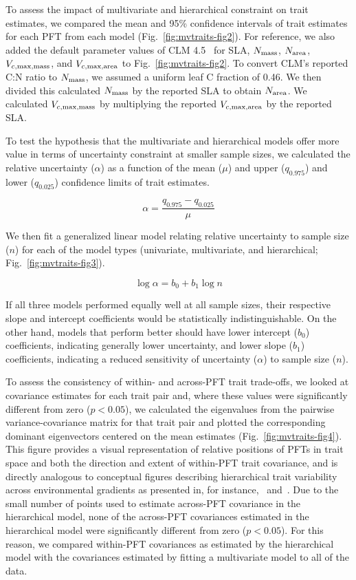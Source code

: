 To assess the impact of multivariate and hierarchical constraint on trait estimates,
we compared the mean and 95\% confidence intervals of trait estimates for each PFT from each model (Fig.~\ref{fig:mvtraits-fig2}).
For reference, we also added the default parameter values of CLM 4.5~\cite[Table 8.1 in][]{clm45_note} for SLA, $N_{\text{mass}}$, $N_{\text{area}}$, $V_{c,\max,\text{mass}}$, and $V_{c,\max,\text{area}}$ to Fig.~\ref{fig:mvtraits-fig2}.
To convert CLM's reported C:N ratio to $N_{\text{mass}}$, we assumed a uniform leaf C fraction of 0.46.
We then divided this calculated $N_{\text{mass}}$ by the reported SLA to obtain $N_{\text{area}}$.
We calculated $V_{c,\max,\text{mass}}$ by multiplying the reported $V_{c,\max,\text{area}}$ by the reported SLA\@.

To test the hypothesis that the multivariate and hierarchical models offer more value in terms of uncertainty constraint at smaller sample sizes, we calculated the relative uncertainty ($\alpha$) as a function of the mean ($\mu$) and upper ($q_{0.975}$) and lower ($q_{0.025}$) confidence limits of trait estimates.

\[ \alpha = \frac{q_{0.975} - q_{0.025}}{\mu} \]

We then fit a generalized linear model relating relative uncertainty to sample size ($n$) for each of the model types (univariate, multivariate, and hierarchical; Fig.~\ref{fig:mvtraits-fig3}).

\[ \log{\alpha} = b_0 + b_1 \log{n} \]

If all three models performed equally well at all sample sizes, their respective slope and intercept coefficients would be statistically indistinguishable.
On the other hand, models that perform better should have
lower intercept ($b_0$) coefficients, indicating generally lower uncertainty,
and
lower slope ($b_1$) coefficients, indicating a reduced sensitivity of uncertainty ($\alpha$) to sample size ($n$).

To assess the consistency of within- and across-PFT trait trade-offs, we looked at covariance estimates for each trait pair and, where these values were significantly different from zero ($p < 0.05$),
we calculated the eigenvalues from the pairwise variance-covariance matrix for that trait pair and plotted the corresponding dominant eigenvectors centered on the mean estimates (Fig.~\ref{fig:mvtraits-fig4}).
This figure provides a visual representation of relative positions of PFTs in trait space and both the direction and extent of within-PFT trait covariance, and is directly analogous to conceptual figures describing hierarchical trait variability across environmental gradients as presented in, for instance,~\cite{cornwell_community_2009} and~\cite{albert_intraspecific_2010}.
Due to the small number of points used to estimate across-PFT covariance in the hierarchical model, none of the across-PFT covariances estimated in the hierarchical model were significantly different from zero ($p < 0.05$).
For this reason, we compared within-PFT covariances as estimated by the hierarchical model with the covariances estimated by fitting a multivariate model to all of the data.

